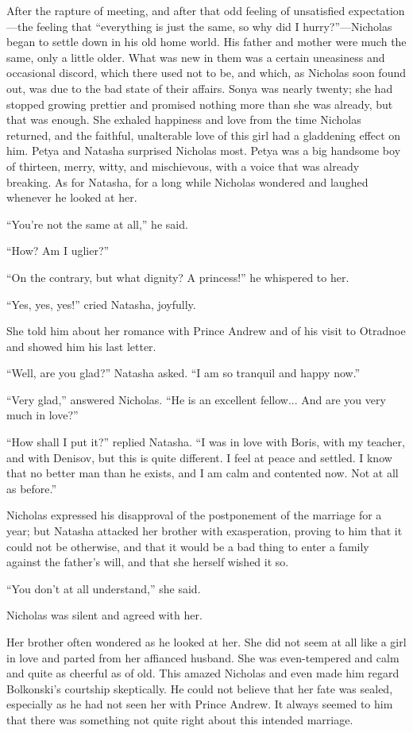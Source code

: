 After the rapture of meeting, and after that odd feeling of
unsatisfied expectation---the feeling that ``everything is just
the same, so why did I hurry?''---Nicholas began to settle down
in his old home world. His father and mother were much the same,
only a little older. What was new in them was a certain
uneasiness and occasional discord, which there used not to be,
and which, as Nicholas soon found out, was due to the bad state
of their affairs. Sonya was nearly twenty; she had stopped
growing prettier and promised nothing more than she was already,
but that was enough. She exhaled happiness and love from the time
Nicholas returned, and the faithful, unalterable love of this
girl had a gladdening effect on him.  Petya and Natasha surprised
Nicholas most. Petya was a big handsome boy of thirteen, merry,
witty, and mischievous, with a voice that was already
breaking. As for Natasha, for a long while Nicholas wondered and
laughed whenever he looked at her.

``You're not the same at all,'' he said.

``How? Am I uglier?''

``On the contrary, but what dignity? A princess!'' he whispered
to her.

``Yes, yes, yes!'' cried Natasha, joyfully.

She told him about her romance with Prince Andrew and of his
visit to Otradnoe and showed him his last letter.

``Well, are you glad?'' Natasha asked. ``I am so tranquil and
happy now.''

``Very glad,'' answered Nicholas. ``He is an excellent
fellow... And are you very much in love?''

``How shall I put it?'' replied Natasha. ``I was in love with
Boris, with my teacher, and with Denisov, but this is quite
different. I feel at peace and settled. I know that no better man
than he exists, and I am calm and contented now. Not at all as
before.''

Nicholas expressed his disapproval of the postponement of the
marriage for a year; but Natasha attacked her brother with
exasperation, proving to him that it could not be otherwise, and
that it would be a bad thing to enter a family against the
father's will, and that she herself wished it so.

``You don't at all understand,'' she said.

Nicholas was silent and agreed with her.

Her brother often wondered as he looked at her. She did not seem
at all like a girl in love and parted from her affianced
husband. She was even-tempered and calm and quite as cheerful as
of old. This amazed Nicholas and even made him regard Bolkonski's
courtship skeptically. He could not believe that her fate was
sealed, especially as he had not seen her with Prince Andrew. It
always seemed to him that there was something not quite right
about this intended marriage.

